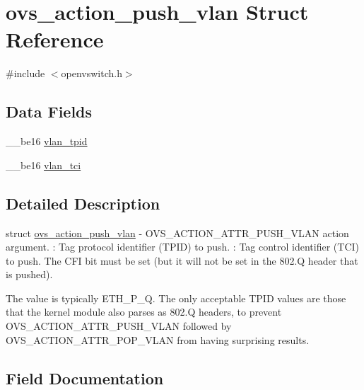 \hypertarget{structovs__action__push__vlan}{}\section{ovs\+\_\+action\+\_\+push\+\_\+vlan Struct Reference}
\label{structovs__action__push__vlan}


{\ttfamily \#include $<$openvswitch.\+h$>$}

\subsection*{Data Fields}
\begin{DoxyCompactItemize}
\item 
\+\_\+\+\_\+be16 \hyperlink{structovs__action__push__vlan_af2e36cd70149cf03ebf29586fc765722}{vlan\+\_\+tpid}
\item 
\+\_\+\+\_\+be16 \hyperlink{structovs__action__push__vlan_ab17c8db02bffc32a072bd23687dd712c}{vlan\+\_\+tci}
\end{DoxyCompactItemize}


\subsection{Detailed Description}
struct \hyperlink{structovs__action__push__vlan}{ovs\+\_\+action\+\_\+push\+\_\+vlan} -\/ O\+V\+S\+\_\+\+A\+C\+T\+I\+O\+N\+\_\+\+A\+T\+T\+R\+\_\+\+P\+U\+S\+H\+\_\+\+V\+L\+A\+N action argument. \+: Tag protocol identifier (T\+P\+I\+D) to push. \+: Tag control identifier (T\+C\+I) to push. The C\+F\+I bit must be set (but it will not be set in the 802.\+Q header that is pushed).

The  value is typically E\+T\+H\+\_\+\+P\+\_\+Q. The only acceptable T\+P\+I\+D values are those that the kernel module also parses as 802.\+Q headers, to prevent O\+V\+S\+\_\+\+A\+C\+T\+I\+O\+N\+\_\+\+A\+T\+T\+R\+\_\+\+P\+U\+S\+H\+\_\+\+V\+L\+A\+N followed by O\+V\+S\+\_\+\+A\+C\+T\+I\+O\+N\+\_\+\+A\+T\+T\+R\+\_\+\+P\+O\+P\+\_\+\+V\+L\+A\+N from having surprising results. 

\subsection{Field Documentation}
\hypertarget{structovs__action__push__vlan_ab17c8db02bffc32a072bd23687dd712c}{}
